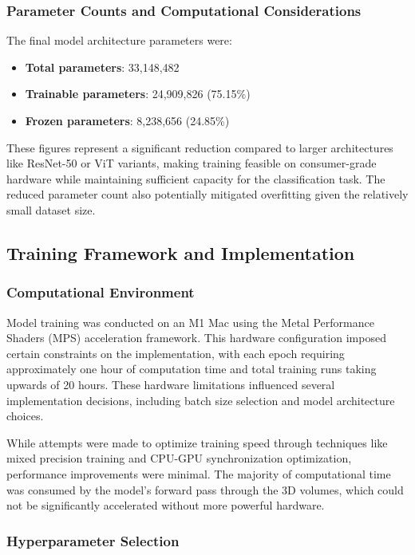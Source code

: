 \documentclass[12pt, a4paper]{article}
\begin{document}
\subsubsection{Parameter Counts and Computational Considerations}

The final model architecture parameters were:

\begin{itemize}
    \item \textbf{Total parameters}: 33,148,482
    \item \textbf{Trainable parameters}: 24,909,826 (75.15\%)
    \item \textbf{Frozen parameters}: 8,238,656 (24.85\%)
\end{itemize}

These figures represent a significant reduction compared to larger architectures like ResNet-50 or ViT variants, making training feasible on consumer-grade hardware while maintaining sufficient capacity for the classification task. The reduced parameter count also potentially mitigated overfitting given the relatively small dataset size.

\subsection{Training Framework and Implementation}

\subsubsection{Computational Environment}

Model training was conducted on an M1 Mac using the Metal Performance Shaders (MPS) acceleration framework. This hardware configuration imposed certain constraints on the implementation, with each epoch requiring approximately one hour of computation time and total training runs taking upwards of 20 hours. These hardware limitations influenced several implementation decisions, including batch size selection and model architecture choices.

While attempts were made to optimize training speed through techniques like mixed precision training and CPU-GPU synchronization optimization, performance improvements were minimal. The majority of computational time was consumed by the model's forward pass through the 3D volumes, which could not be significantly accelerated without more powerful hardware.

\subsubsection{Hyperparameter Selection}
\end{document}
